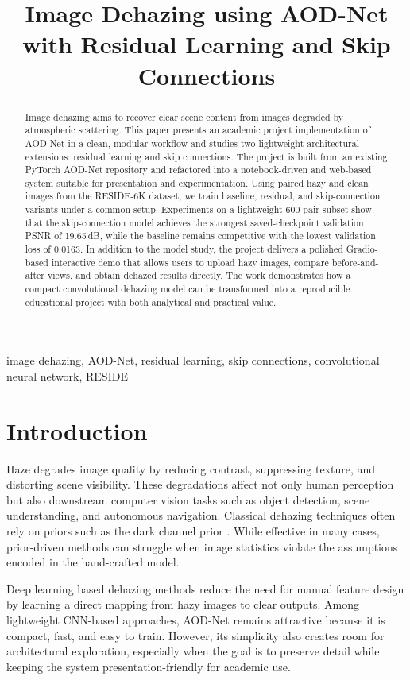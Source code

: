 \documentclass[conference]{IEEEtran}
\title{Image Dehazing using AOD-Net with Residual Learning and Skip Connections}
\author{
\IEEEauthorblockN{Ritwick Ranjan}
\IEEEauthorblockA{Department of Computer Science\\
Your Institute Name\\
Email: your.email@domain.com}
}
\begin{document}
\maketitle

\begin{abstract}
Image dehazing aims to recover clear scene content from images degraded by atmospheric scattering. This paper presents an academic project implementation of AOD-Net in a clean, modular workflow and studies two lightweight architectural extensions: residual learning and skip connections. The project is built from an existing PyTorch AOD-Net repository and refactored into a notebook-driven and web-based system suitable for presentation and experimentation. Using paired hazy and clean images from the RESIDE-6K dataset, we train baseline, residual, and skip-connection variants under a common setup. Experiments on a lightweight 600-pair subset show that the skip-connection model achieves the strongest saved-checkpoint validation PSNR of 19.65\,dB, while the baseline remains competitive with the lowest validation loss of 0.0163. In addition to the model study, the project delivers a polished Gradio-based interactive demo that allows users to upload hazy images, compare before-and-after views, and obtain dehazed results directly. The work demonstrates how a compact convolutional dehazing model can be transformed into a reproducible educational project with both analytical and practical value.
\end{abstract}

\begin{IEEEkeywords}
image dehazing, AOD-Net, residual learning, skip connections, convolutional neural network, RESIDE
\end{IEEEkeywords}

\section{Introduction}
Haze degrades image quality by reducing contrast, suppressing texture, and distorting scene visibility. These degradations affect not only human perception but also downstream computer vision tasks such as object detection, scene understanding, and autonomous navigation. Classical dehazing techniques often rely on priors such as the dark channel prior \cite{he2009darkchannel}. While effective in many cases, prior-driven methods can struggle when image statistics violate the assumptions encoded in the hand-crafted model.

Deep learning based dehazing methods reduce the need for manual feature design by learning a direct mapping from hazy images to clear outputs. Among lightweight CNN-based approaches, AOD-Net \cite{li2017aodnet} remains attractive because it is compact, fast, and easy to train. However, its simplicity also creates room for architectural exploration, especially when the goal is to preserve detail while keeping the system presentation-friendly for academic use.
\end{document}
